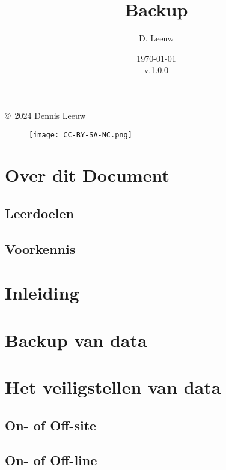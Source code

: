 \documentclass[a4paper,12pt,twoside,openright,titlepage]{book}
\author{D. Leeuw}
\title{Backup}
\date{\today\\v.1.0.0}
\begin{document}

\maketitle

\copyright\ 2024 Dennis Leeuw\\

\begin{figure}
\texttt{[image: CC-BY-SA-NC.png]}
\end{figure}

\bigskip




\frontmatter
\chapter{Over dit Document}
\section{Leerdoelen}

\section{Voorkennis}


\tableofcontents

\mainmatter
\chapter{Inleiding}


\chapter{Backup van data}


\chapter{Het veiligstellen van data}
\section{On- of Off-site}

\section{On- of Off-line}

\end{document}
